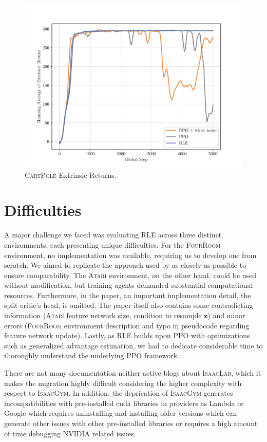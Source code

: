 \begin{figure}[H]
  \centering
  \includegraphics[width=\textwidth]{figures/plot_Cartpole_Extrinsic Return.pdf}
  \caption{\textsc{CartPole} Extrinsic Returns.}
  \label{fig:cartpole-return}
\end{figure}

\hypertarget{appendix-difficult}{\section{Difficulties}}

\noindent A major challenge we faced was evaluating \textsc{RLE} across three distinct environments, each presenting unique difficulties. For the \textsc{FourRoom} environment, no implementation was available, requiring us to develop one from scratch. We aimed to replicate the approach used by \cite{rle-paper} as closely as possible to ensure comparability. The \textsc{Atari} environment, on the other hand, could be used without modification, but training agents demanded substantial computational resources. Furthermore, in the paper, an important implementation detail, the split critic's head, is omitted. The paper itself also contains some contradicting information (\textsc{Atari} feature network size, condition to resample $\textbf{z}$) and minor errors (\textsc{FourRoom} environment description and typo in pseudocode regarding feature network update). Lastly, as \textsc{RLE} builds upon \textsc{PPO} with optimizations such as generalized advantage estimation, we had to dedicate considerable time to thoroughly understand the underlying \textsc{PPO} framework.

\noindent There are not many documentation neither active blogs about \textsc{IsaacLab}, which it makes the migration highly difficult considering the higher complexity with respect
to \textsc{IsaacGym}. In addition, the deprication of \textsc{IsaacGym} generates incompatibilities with pre-installed cuda libraries in providers as Lambda or Google which requires uninstalling
and installing older versions which can generate other issues with other pre-installed libraries or requires a high amount of time debugging NVIDIA related issues.